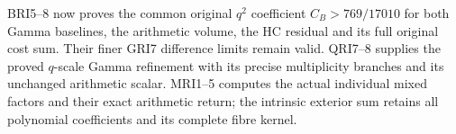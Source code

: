 BRI5--8 now proves the common original $q^2$ coefficient
$C_B>769/17010$ for both Gamma baselines, the arithmetic volume,
the HC residual and its full original cost sum. Their finer
GRI7 difference limits remain valid. QRI7--8 supplies the proved
$q$-scale Gamma refinement with its precise multiplicity branches
and its unchanged arithmetic scalar. MRI1--5 computes the actual
individual mixed factors and their exact arithmetic return; the
intrinsic exterior sum retains all polynomial coefficients and
its complete fibre kernel.